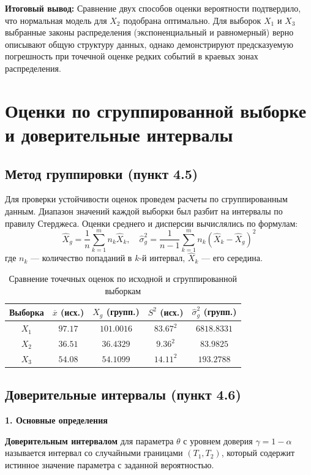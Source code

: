 \documentclass[a4paper,12pt]{article}
\begin{document}
\textbf{Итоговый вывод:}
Сравнение двух способов оценки вероятности подтвердило, что нормальная модель для $X_2$ подобрана оптимально. Для выборок $X_1$ и $X_3$ выбранные законы распределения (экспоненциальный и равномерный) верно описывают общую структуру данных, однако демонстрируют предсказуемую погрешность при точечной оценке редких событий в краевых зонах распределения.

\newpage

\section{Оценки по сгруппированной выборке и доверительные интервалы}

\subsection{Метод группировки (пункт 4.5)}
Для проверки устойчивости оценок проведем расчеты по сгруппированным данным. Диапазон значений каждой выборки был разбит на интервалы по правилу Стерджеса. Оценки среднего и дисперсии вычислялись по формулам:
\[
\hat{X}_{g} = \frac{1}{n}\sum_{k=1}^{m}n_{k}\hat{X}_{k}, \quad \hat{\sigma}_{g}^{2} = \frac{1}{n-1}\sum_{k=1}^{m}n_{k}(\hat{X}_{k}-\hat{X}_{g})^{2}
\]
где $n_k$ — количество попаданий в $k$-й интервал, $\hat{X}_k$ — его середина.

\begin{table}[H]
\centering
\begin{tabular}{|c|c|c|c|c|}
\hline
Выборка & $\overline{x}$ (исх.) & $\hat{X}_{g}$ (групп.) & $S^2$ (исх.) & $\hat{\sigma}_{g}^{2}$ (групп.) \\ \hline
$X_1$ & $97.17$ & $101.0016$ & $83.67^2$ & $6818.8331$ \\ \hline
$X_2$ & $36.51$ & $36.4329$  & $9.36^2$  & $83.9825$   \\ \hline
$X_3$ & $54.08$ & $54.1099$  & $14.11^2$ & $193.2788$  \\ \hline
\end{tabular}
\caption{Сравнение точечных оценок по исходной и сгруппированной выборкам}
\end{table}

\subsection{Доверительные интервалы (пункт 4.6)}

\textbf{1. Основные определения}

\textbf{Доверительным интервалом} для параметра $\theta$ с уровнем доверия $\gamma = 1 - \alpha$ называется интервал со случайными границами $(T_1, T_2)$, который содержит истинное значение параметра с заданной вероятностью.
\end{document}
